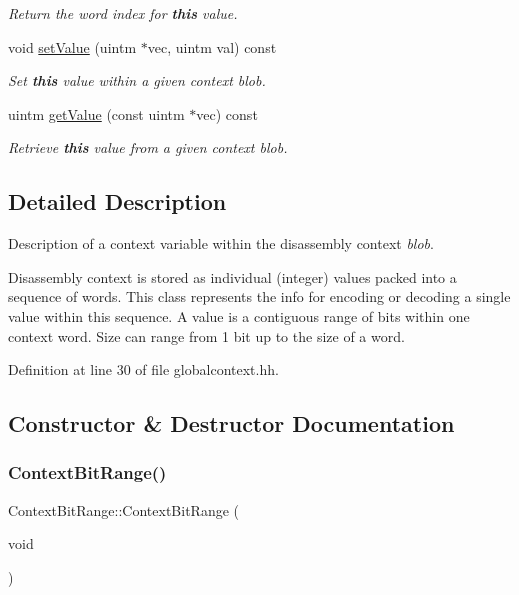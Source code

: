 \begin{DoxyCompactItemize}
\begin{DoxyCompactList}\small\item\em Return the word index for {\bfseries{this}} value. \end{DoxyCompactList}\item 
void \mbox{\hyperlink{class_context_bit_range_a9aa57773da860d022bd8b1b2e59d1790}{set\+Value}} (uintm $\ast$vec, uintm val) const
\begin{DoxyCompactList}\small\item\em Set {\bfseries{this}} value within a given context blob. \end{DoxyCompactList}\item 
uintm \mbox{\hyperlink{class_context_bit_range_a1086e19201eadfc91d14a589d07edab9}{get\+Value}} (const uintm $\ast$vec) const
\begin{DoxyCompactList}\small\item\em Retrieve {\bfseries{this}} value from a given context blob. \end{DoxyCompactList}\end{DoxyCompactItemize}


\subsection{Detailed Description}
Description of a context variable within the disassembly context {\itshape blob}. 

Disassembly context is stored as individual (integer) values packed into a sequence of words. This class represents the info for encoding or decoding a single value within this sequence. A value is a contiguous range of bits within one context word. Size can range from 1 bit up to the size of a word. 

Definition at line 30 of file globalcontext.\+hh.



\subsection{Constructor \& Destructor Documentation}
\mbox{\label{class_context_bit_range_a7b685d0de2d5349df441670a823dae73}} 
\subsubsection{\texorpdfstring{ContextBitRange()}{ContextBitRange()}\hspace{0.1cm}{\footnotesize\ttfamily [1/2]}}
{\footnotesize\ttfamily Context\+Bit\+Range\+::\+Context\+Bit\+Range (\begin{DoxyParamCaption}\item[{void}]{ }\end{DoxyParamCaption})\hspace{0.3cm}{\ttfamily [inline]}}



